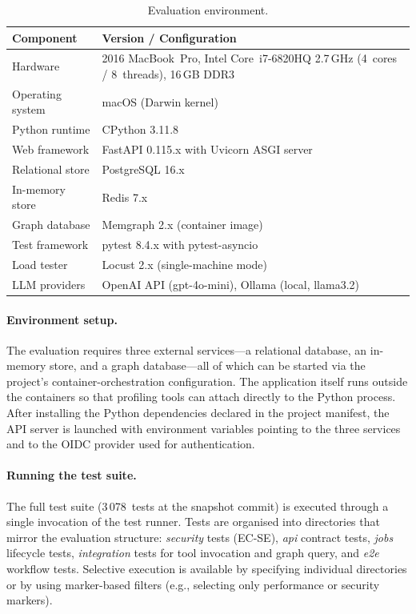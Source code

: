 \documentclass[a4paper]{sapthesis}
\begin{document}
\begin{table}[ht]
\centering
\caption{Evaluation environment.}
\label{tab:app-env}
\small
\begin{tabularx}{\textwidth}{@{}l X@{}}
    \hline
    \textbf{Component} & \textbf{Version / Configuration} \\
    \hline
    Hardware          & 2016 MacBook~Pro, Intel Core~i7-6820HQ 2.7\,GHz (4~cores / 8~threads), 16\,GB DDR3 \\
    Operating system  & macOS (Darwin kernel) \\
    Python runtime    & CPython 3.11.8 \\
    Web framework     & FastAPI 0.115.x with Uvicorn ASGI server \\
    Relational store  & PostgreSQL 16.x \\
    In-memory store   & Redis 7.x \\
    Graph database    & Memgraph 2.x (container image) \\
    Test framework    & pytest 8.4.x with pytest-asyncio \\
    Load tester       & Locust 2.x (single-machine mode) \\
    LLM providers     & OpenAI API (gpt-4o-mini), Ollama (local, llama3.2) \\
    \hline
\end{tabularx}
\end{table}

\paragraph{Environment setup.}
The evaluation requires three external services---a relational database,
an in-memory store, and a graph database---all of which can be started
via the project's container-orchestration configuration.  The
application itself runs outside the containers so that profiling tools
can attach directly to the Python process.  After installing the Python
dependencies declared in the project manifest, the API server is
launched with environment variables pointing to the three services and
to the OIDC provider used for authentication.

\paragraph{Running the test suite.}
The full test suite (3\,078~tests at the snapshot commit) is executed
through a single invocation of the test runner.  Tests are organised
into directories that mirror the evaluation structure:
\emph{security} tests (EC-SE), \emph{api} contract tests,
\emph{jobs} lifecycle tests, \emph{integration} tests for tool
invocation and graph query, and \emph{e2e} workflow tests.  Selective
execution is available by specifying individual directories or by using
marker-based filters (e.g., selecting only performance or security
markers).
\end{document}
